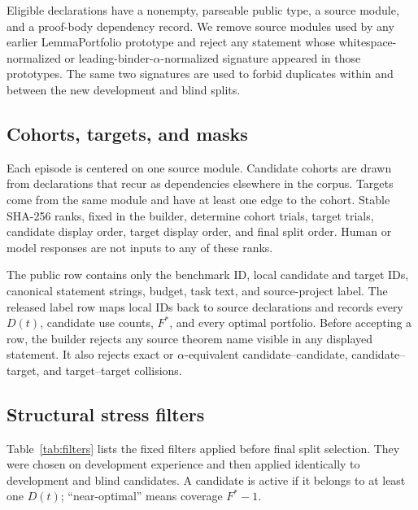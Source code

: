 Eligible declarations have a nonempty, parseable public type, a source module,
and a proof-body dependency record.  We remove source modules used by any
earlier LemmaPortfolio prototype and reject any statement whose whitespace-
normalized or leading-binder-$\alpha$-normalized signature appeared in those
prototypes.  The same two signatures are used to forbid duplicates within and
between the new development and blind splits.

\subsection{Cohorts, targets, and masks}

Each episode is centered on one source module.  Candidate cohorts are drawn
from declarations that recur as dependencies elsewhere in the corpus.  Targets
come from the same module and have at least one edge to the cohort.  Stable
SHA-256 ranks, fixed in the builder, determine cohort trials, target trials,
candidate display order, target display order, and final split order.  Human or
model responses are not inputs to any of these ranks.

The public row contains only the benchmark ID, local candidate and target IDs,
canonical statement strings, budget, task text, and source-project label.  The
released label row maps local IDs back to source declarations and
records every $D(t)$, candidate use counts, $F^*$, and every optimal portfolio.
Before accepting a row, the builder rejects any source theorem name visible in
any displayed statement.  It also rejects exact or $\alpha$-equivalent
candidate--candidate, candidate--target, and target--target collisions.

\subsection{Structural stress filters}

Table~\ref{tab:filters} lists the fixed filters applied before final split
selection.  They were chosen on development experience and then applied
identically to development and blind candidates.  A candidate is active if it
belongs to at least one $D(t)$; ``near-optimal'' means coverage $F^*-1$.


